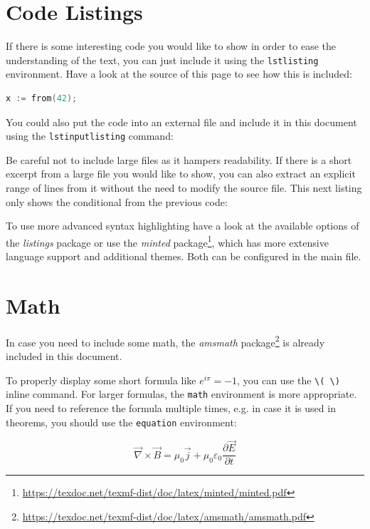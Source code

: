 \section{Code Listings}
If there is some interesting code you would like to show
in order to ease the understanding of the text,
you can just include it using the \verb+lstlisting+ environment.
Have a look at the source of this page to see how this is included:

\begin{lstlisting}[language=Go]
x := from(42);
\end{lstlisting}

You could also put the code into an external file
and include it in this document using the \verb+lstinputlisting+ command:



Be careful not to include large files as it hampers readability.
If there is a short excerpt from a large file you would like to show,
you can also extract an explicit range of lines from it without the need to modify the source file.
This next listing only shows the conditional from the previous code:



To use more advanced syntax highlighting
have a look at the available options of the \emph{listings} package
or use the \emph{minted} package\footnote{\url{https://texdoc.net/texmf-dist/doc/latex/minted/minted.pdf}},
which has more extensive language support and additional themes.
Both can be configured in the main file.
\newpage
\section{Math}
In case you need to include some math,
the \emph{amsmath} package\footnote{\url{https://texdoc.net/texmf-dist/doc/latex/amsmath/amsmath.pdf}} is already included in this document.

To properly display some short formula like \( e^{i \pi} = -1\),
you can use the \verb+\( \)+ inline command.
For larger formulas, the \verb+math+ environment is more appropriate.
If you need to reference the formula multiple times,
e.g. in case it is used in theorems,
you should use the \verb+equation+ environment:

\begin{equation}
	\vec\nabla\times\vec{B}= \mu_0\vec{j}+\mu_0\varepsilon_0\frac{\partial\vec{E}}{\partial t}
	\label{func}
\end{equation}

